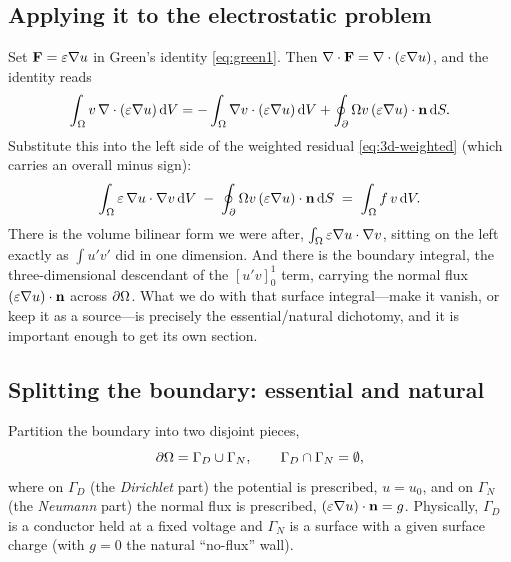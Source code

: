 \subsection{Applying it to the electrostatic problem}

Set $\mathbf{F} = \varepsilon\nabla u$ in Green's identity \cref{eq:green1}. Then
$\nabla\cdot\mathbf{F} = \nabla\cdot(\varepsilon\nabla u)$, and the identity reads
\[
  \int_\Omega v\,\nabla\cdot(\varepsilon\nabla u)\,\mathrm{d}V
  = -\int_\Omega \nabla v\cdot(\varepsilon\nabla u)\,\mathrm{d}V
  + \oint_\partial\Omega v\,(\varepsilon\nabla u)\cdot\mathbf{n}\,\mathrm{d}S.
\]
Substitute this into the left side of the weighted residual
\cref{eq:3d-weighted} (which carries an overall minus sign):
\begin{equation}
  \int_\Omega \varepsilon\,\nabla u\cdot\nabla v\,\mathrm{d}V
  \;-\;
  \oint_\partial\Omega v\,(\varepsilon\nabla u)\cdot\mathbf{n}\,\mathrm{d}S
  \;=\;
  \int_\Omega f\,v\,\mathrm{d}V.
  \label{eq:3d-with-boundary}
\end{equation}
There is the volume bilinear form we were after, $\int_\Omega\varepsilon\nabla
u\cdot\nabla v$, sitting on the left exactly as $\int u'v'$ did in one dimension.
And there is the boundary integral, the three-dimensional descendant of the
$[u'v]_0^1$ term, carrying the normal flux $(\varepsilon\nabla u)\cdot\mathbf{n}$ across
$\partial\Omega$. What we do with that surface integral---make it vanish, or keep it as a
source---is precisely the essential/natural dichotomy, and it is important
enough to get its own section.

\subsection{Splitting the boundary: essential and natural}
\label{sec:essential-natural}

Partition the boundary into two disjoint pieces,
\[
  \partial\Omega = \Gamma_D \cup \Gamma_N, \qquad \Gamma_D\cap\Gamma_N=\emptyset,
\]
where on $\Gamma_D$ (the \emph{Dirichlet} part) the potential is prescribed,
$u = u_0$, and on $\Gamma_N$ (the \emph{Neumann} part) the normal flux is
prescribed, $(\varepsilon\nabla u)\cdot\mathbf{n} = g$. Physically, $\Gamma_D$ is a
conductor held at a fixed voltage and $\Gamma_N$ is a surface with a given
surface charge (with $g=0$ the natural ``no-flux'' wall).


